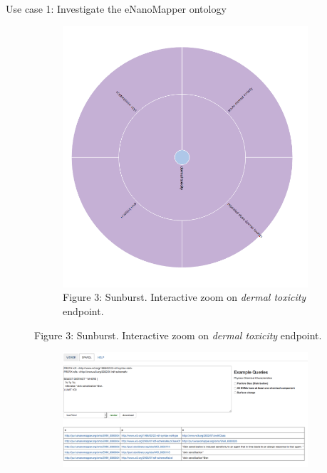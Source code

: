 \documentclass[final]{beamer}
\begin{document}
\begin{frame}{}
\begin{textblock}{62}
\begin{block}{Use case 1: Investigate the eNanoMapper ontology}
\begin{figure}
\begin{subfigure}[c]{0.2\textwidth}
            \includegraphics[width=\textwidth,keepaspectratio]{onto-use-case-1b.png}
            \caption{Figure 3: Sunburst. Interactive zoom on \emph{dermal toxicity} endpoint.}
          \end{subfigure}
        \end{figure}
        \vspace{0.05\textwidth}
        \begin{figure}
          \hspace{-0.1\textwidth}
          \begin{subfigure}[c]{0.3\textwidth}
            \includegraphics[width=\textwidth,keepaspectratio]{onto-use-case-1c.png}

\end{subfigure}
\end{figure}
\end{block}
\end{textblock}
\end{frame}
\end{document}
